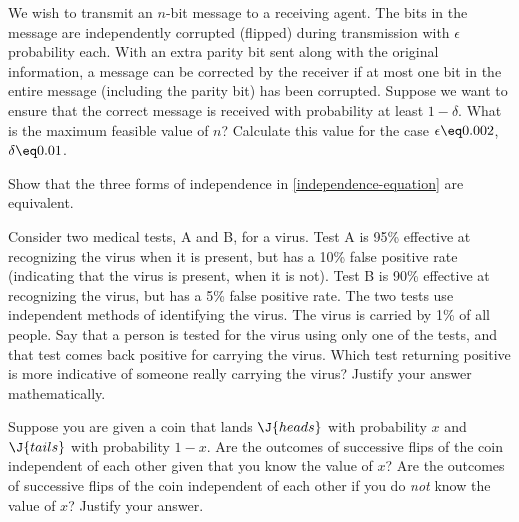 \begin{iexercise}
We wish to transmit an \(n\)-bit message to a receiving agent.  The bits in the
message are independently corrupted (flipped) during transmission with
\(\epsilon\) probability each.  With an extra parity bit sent along with
the original information, a message can be corrected by the receiver if at most one bit in
the entire message (including the parity bit) has
been corrupted.  Suppose we want to ensure that the correct message is
received with probability at least \(1-\delta\).
What is the maximum feasible value of \(n\)?
Calculate this value for the case \(\epsilon\eq 0.002\), \(\delta\eq 0.01\).
\end{iexercise} 

\begin{exercise}%
Show that the three forms of independence in \eqref{independence-equation}
are equivalent.
\end{exercise} 



\begin{exercise}
Consider two medical tests, A and B, for a virus.  Test A is 95\% effective at
recognizing the virus when it is present, but has a 10\% false positive
rate (indicating that the virus is present, when it is not).  Test B
is 90\% effective at recognizing the virus, but has a 5\% false positive
rate.  The two tests use independent methods of
identifying the virus.  The virus is carried by 1\% of all people.  Say
that a person is tested for the virus using only one of the tests, and
that test comes back positive for carrying the virus.  Which test
returning positive is more indicative of someone really carrying the
virus?  Justify your answer mathematically.
\end{exercise} 

\begin{exercise}
Suppose you are given a coin that lands \(\J{heads}\) with probability \(x\) and \(\J{tails}\) with probability \(1 - x\).
Are the outcomes of successive flips of the coin independent of each other given that you know the value of \(x\)?
Are the outcomes of successive flips of the coin independent of each other if you do {\em not} know the value of \(x\)? 
Justify your answer.
\end{exercise} 


